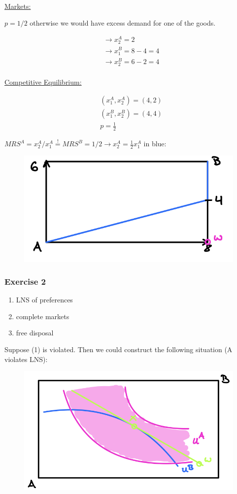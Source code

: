 {{\begin{enumerate}[label=(\roman*)]
{\underline{Markets:}

$p=1 / 2$ otherwise we would have excess demand for one of the goods.

$$
\begin{aligned}
    & \longrightarrow x_{2}^{A}=2 \\
    & \longrightarrow x_{1}^{B}=8-4=4 \\
    & \longrightarrow x_{2}^{B}=6-2=4 \\
\end{aligned}
$$

\underline{Competitive Equilibrium:}

$$
\begin{aligned}
    & \left(x_{1}^{A}, x_{2}^{A}\right)=(4,2) \\
    & \left(x_{1}^{B}, x_{2}^{B}\right)=(4,4) \\
    & p=\frac{1}{2}
\end{aligned}
$$
}
{\item 
$M RS^{A}=x_{2}^{A} / x_{1}^{A} \stackrel{!}{=} M R S^{B}=1 / 2 \longrightarrow x_{2}^{A}=\frac{1}{2} x_{1}^{A}$ in blue:

\begin{figure}[!htp]
    \centering
    \includegraphics[width=.5\textwidth]{images/2019_20_1.png}
\end{figure}
}
\end{enumerate}
}
{
\subsubsection*{Exercise 2}

\begin{enumerate}
    \item LNS of preferences
    \item complete markets
    \item free disposal
\end{enumerate}

Suppose (1) is violated. Then we could construct the following situation (A violates LNS):

\begin{figure}[!htp]
    \centering
    \includegraphics[width=.75\textwidth]{images/2019_20_2.png}
\end{figure}

}}
